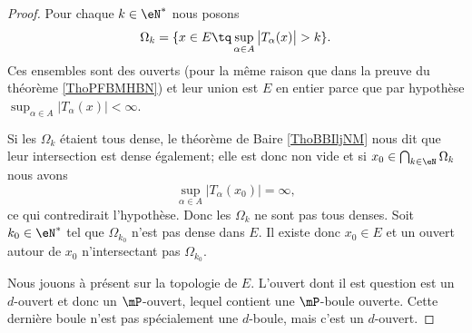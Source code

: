 \begin{proof}
    Pour chaque \( k\in \eN^*\) nous posons
    \begin{equation}
        \Omega_k=\{ x\in E\tq \sup_{\alpha\in A}\big| T_{\alpha}(x) \big|>k \}.
    \end{equation}
    Ces ensembles sont des ouverts (pour la même raison que dans la preuve du théorème \ref{ThoPFBMHBN}) et leur union est \( E\) en entier parce que par hypothèse \( \sup_{\alpha\in A}\big| T_{\alpha}(x) \big|<\infty\).

    Si les \( \Omega_k\) étaient tous dense, le théorème de Baire \ref{ThoBBIljNM} nous dit que leur intersection est dense également; elle est donc non vide et si \( x_0\in\bigcap_{k\in \eN}\Omega_k\) nous avons
    \begin{equation}
        \sup_{\alpha\in A}\big| T_{\alpha}(x_0) \big|=\infty,
    \end{equation}
    ce qui contredirait l'hypothèse. Donc les \( \Omega_k\) ne sont pas tous denses. Soit \( k_0\in \eN^*\) tel que \( \Omega_{k_0}\) n'est pas dense dans \( E\). Il existe donc \( x_0\in E\) et un ouvert autour de \( x_0\) n'intersectant pas \( \Omega_{k_0}\).

    Nous jouons à présent sur la topologie de \( E\). L'ouvert dont il est question est un \( d\)-ouvert et donc un \( \mP\)-ouvert, lequel contient une \( \mP\)-boule ouverte. Cette dernière boule n'est pas spécialement une \( d\)-boule, mais c'est un \( d\)-ouvert.


\end{proof}
